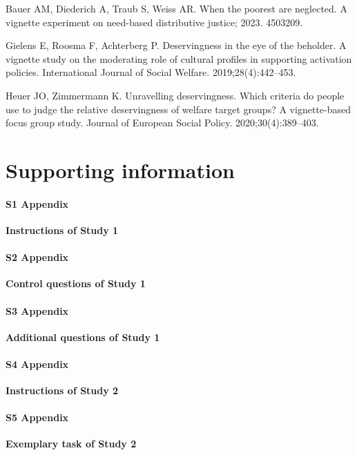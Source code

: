 \documentclass[10pt,letterpaper]{article}
\begin{document}
\begin{thebibliography}{100}
Bauer AM, Diederich A, Traub S, Weiss AR.
\newblock When the poorest are neglected. {A} vignette experiment on need-based
  distributive justice; 2023. 4503209.

Gielens E, Roosma F, Achterberg P.
\newblock Deservingness in the eye of the beholder. {A} vignette study on the
  moderating role of cultural profiles in supporting activation policies.
\newblock International Journal of Social Welfare. 2019;28(4):442--453.

Heuer JO, Zimmermann K.
\newblock Unravelling deservingness. {Which} criteria do people use to judge
  the relative deservingness of welfare target groups? {A} vignette-based focus
  group study.
\newblock Journal of European Social Policy. 2020;30(4):389--403.

\end{thebibliography}


\clearpage
\section*{Supporting information}

\paragraph*{S1 Appendix}
\label{sec:app_study_1_instructions}
{\bf Instructions of Study 1}

\paragraph*{S2 Appendix}
\label{sec:app_study_1_control_questions}
{\bf Control questions of Study 1}

\paragraph*{S3 Appendix}
\label{sec:app_study_1_additional_questions}
{\bf Additional questions of Study 1}

\paragraph*{S4 Appendix}
\label{sec:app_study_2_instructions}
{\bf Instructions of Study 2}

\paragraph*{S5 Appendix}
\label{sec:app_study_2_task}
{\bf Exemplary task of Study 2}
\end{document}
